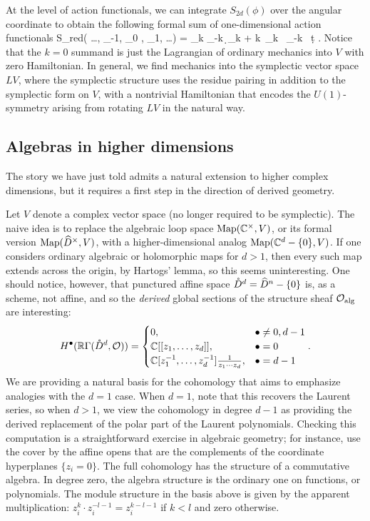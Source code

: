 \documentclass[11pt]{amsart}
\def\owen#1{{\textcolor{red!50!black}{OG: {#1}}}}
\begin{document}
At the level of action functionals, 
we can integrate $S_{2d}(\phi)$ over the angular coordinate to obtain the following formal sum of one-dimensional action functionals
\beqn
S_{red}\left( \ldots, \phi_{-1}, \phi_0 , \phi_1, \ldots \right) = \sum_{k\in \ZZ} \int  \phi_{-k} \,\d \phi_{k} + k\, \phi_k \, \phi_{-k} \, \d t .
\eeqn 
Notice that the $k=0$ summand is just the Lagrangian of ordinary mechanics into $V$ with zero Hamiltonian. 
In general, we find mechanics into the symplectic vector space $LV$, where the symplectic structure uses the residue pairing in addition to the symplectic form on $V$, with a nontrivial Hamiltonian that encodes the $U(1)$-symmetry arising from rotating $LV$ in the natural way.


\subsection{Algebras in higher dimensions }
\label{s:alghigh}

The story we have just told admits a natural extension to higher complex dimensions,
but it requires a first step in the direction of derived geometry.

Let $V$ denote a complex vector space (no longer required to be symplectic).
The naive idea is to replace the algebraic loop space $\Map(\CC^\times,  V)$, or its formal version $\Map(\Hat{D}^\times, V)$, with a higher-dimensional analog $\Map(\CC^d -\{0\}, V)$.
If one considers ordinary algebraic or holomorphic maps for $d > 1$, 
then every such map extends across the origin, by Hartogs' lemma,
so this seems uninteresting.
One should notice, however, that punctured affine space $\mathring{D}^d = \Hat{D}^n -\{0\}$ is, as a scheme, not affine, 
and so the {\em derived} global sections of the structure sheaf $\cO_{\rm alg}$ are interesting:
\[
H^\bu(\RR \Gamma(\mathring{D}^d, \cO)) = \begin{cases} 
0, & \bu \neq 0, d-1 \\ 
\CC[[z_1,\ldots,z_d]], & \bu = 0 \\ 
\CC[z_1^{-1},\ldots,z_d^{-1}] \frac{1}{z_1 \cdots z_d}, & \bu = d-1 
\end{cases} .
\]
We are providing a natural basis for the cohomology 
that aims to emphasize analogies with the $d=1$ case.
When $d=1$, note that this recovers the Laurent series,
so when $d > 1$, 
we view the cohomology in degree $d-1$ as providing the derived replacement of the polar part of the Laurent polynomials.
Checking this computation is a straightforward exercise in algebraic geometry;
for instance, use the cover by the affine opens that are the complements of the coordinate hyperplanes $\{z_i =0\}$.
The full cohomology has the structure of a commutative algebra. 
In degree zero, the algebra structure is the ordinary one on functions, or polynomials.
The module structure in the basis above is given by the apparent multiplication: $z_i^k \cdot z_i^{-l-1} = z_i^{k-l-1}$ if $k < l$ and zero otherwise.
\end{document}
